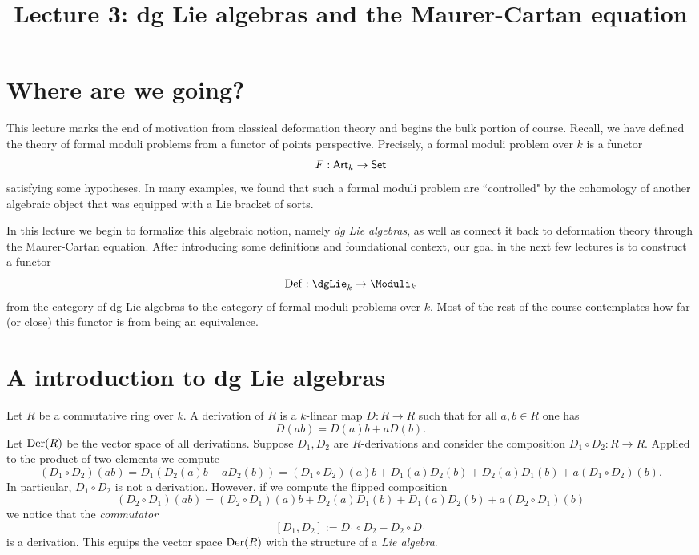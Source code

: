 \documentclass[11pt]{amsart}
\title{Lecture 3: dg Lie algebras and the Maurer-Cartan equation}
\begin{document}
\maketitle

\section{Where are we going?}

This lecture marks the end of motivation from classical deformation theory and begins the bulk portion of course. 
Recall, we have defined the theory of formal moduli problems from a functor of points perspective. 
Precisely, a formal moduli problem over $k$ is a functor
\[
F : {\sf Art}_k \to {\sf Set}
\]
satisfying some hypotheses. 
In many examples, we found that such a formal moduli problem are ``controlled" by the cohomology of another algebraic object that was equipped with a Lie bracket of sorts. 

In this lecture we begin to formalize this algebraic notion, namely {\em dg Lie algebras}, as well as connect it back to deformation theory through the Maurer-Cartan equation. 
After introducing some definitions and foundational context, our goal in the next few lectures is to construct a functor
\[
\Def : \dgLie_k \to \Moduli_k
\]
from the category of dg Lie algebras to the category of formal moduli problems over $k$. 
Most of the rest of the course contemplates how far (or close) this functor is from being an equivalence.

\section{A introduction to dg Lie algebras}


Let $R$ be a commutative ring over $k$. 
A derivation of $R$ is a $k$-linear map $D : R \to R$ such that for all $a,b \in R$ one has
\[
D(ab) = D(a) b + a D(b) .
\] 
Let ${\rm Der}(R)$ be the vector space of all derivations.
Suppose $D_1,D_2$ are $R$-derivations and consider the composition $D_1 \circ D_2 : R \to R$. 
Applied to the product of two elements we compute
\[
(D_1 \circ D_2) (ab) = D_1(D_2(a) b + a D_2(b)) = (D_1 \circ D_2)(a) b + D_1(a) D_2(b) + D_2(a) D_1(b) + a (D_1 \circ D_2)(b) .
\] 
In particular, $D_1 \circ D_2$ is not a derivation. 
However, if we compute the flipped composition
\[
(D_2 \circ D_1) (ab) = (D_2 \circ D_1)(a) b + D_2(a) D_1(b) + D_1(a) D_2(b) + a (D_2 \circ D_1)(b)
\]
we notice that the {\em commutator}
\[
[D_1, D_2] := D_1 \circ D_2 - D_2 \circ D_1
\]
is a derivation. 
This equips the vector space ${\rm Der}(R)$ with the structure of a {\em Lie algebra}. 
\end{document}
